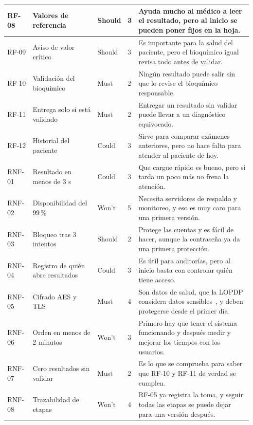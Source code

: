 \documentclass[11pt,a4paper]{article}
\begin{document}
\begin{longtable}{|L{1.4cm}|L{3.0cm}|L{1.9cm}|L{1.8cm}|L{6.2cm}|}
\hline
RF-08 & Valores de referencia & Should & 3 & Ayuda mucho al médico a leer el resultado, pero al inicio se pueden poner fijos en la hoja.\\
\hline
RF-09 & Aviso de valor crítico & Should & 3 & Es importante para la salud del paciente, pero el bioquímico igual revisa todo antes de validar.\\
\hline
RF-10 & Validación del bioquímico & Must & 2 & Ningún resultado puede salir sin que lo revise el bioquímico responsable.\\
\hline
RF-11 & Entrega solo si está validado & Must & 2 & Entregar un resultado sin validar puede llevar a un diagnóstico equivocado.\\
\hline
RF-12 & Historial del paciente & Could & 3 & Sirve para comparar exámenes anteriores, pero no hace falta para atender al paciente de hoy.\\
\hline
RNF-01 & Resultado en menos de 3 s & Could & 3 & Que cargue rápido es bueno, pero si tarda un poco más no frena la atención.\\
\hline
RNF-02 & Disponibilidad del 99\,\% & Won't & 5 & Necesita servidores de respaldo y monitoreo, y eso es muy caro para una primera versión.\\
\hline
RNF-03 & Bloqueo tras 3 intentos & Should & 2 & Protege las cuentas y es fácil de hacer, aunque la contraseña ya da una primera protección.\\
\hline
RNF-04 & Registro de quién abre resultados & Could & 3 & Es útil para auditorías, pero al inicio basta con controlar quién tiene acceso.\\
\hline
RNF-05 & Cifrado AES y TLS & Must & 4 & Son datos de salud, que la LOPDP considera datos sensibles~\cite{lopdp2021}, y deben protegerse desde el primer día.\\
\hline
RNF-06 & Orden en menos de 2 minutos & Won't & 3 & Primero hay que tener el sistema funcionando y después medir y mejorar los tiempos con los usuarios.\\
\hline
RNF-07 & Cero resultados sin validar & Must & 2 & Es lo que se comprueba para saber que RF-10 y RF-11 de verdad se cumplen.\\
\hline
RNF-08 & Trazabilidad de etapas & Won't & 4 & RF-05 ya registra la toma, y seguir todas las etapas se puede dejar para una versión después.\\
\hline
\end{longtable}
\end{document}
